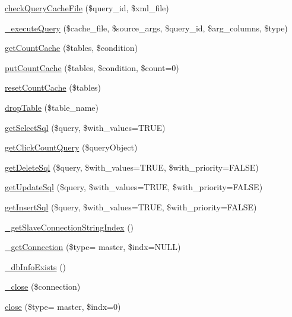 \begin{DoxyCompactItemize}
\hyperlink{classDB_a0bbeb84cee13c54916b7f9aac6db4791}{check\+Query\+Cache\+File} (\$query\+\_\+id, \$xml\+\_\+file)
\item 
\hyperlink{classDB_abb9920613c642481dc4c7b5f6f8fe9b2}{\+\_\+execute\+Query} (\$cache\+\_\+file, \$source\+\_\+args, \$query\+\_\+id, \$arg\+\_\+columns, \$type)
\item 
\hyperlink{classDB_af638cf3ae9ad406810b2f8c2d322225c}{get\+Count\+Cache} (\$tables, \$condition)
\item 
\hyperlink{classDB_a90771d4eaa0ff60a1ddbeb338f2ab801}{put\+Count\+Cache} (\$tables, \$condition, \$count=0)
\item 
\hyperlink{classDB_a8167fd227a1955f8300c0d0e70dd9d9e}{reset\+Count\+Cache} (\$tables)
\item 
\hyperlink{classDB_a63a3a5bdc8e30e1cee37cefddd5ce8de}{drop\+Table} (\$table\+\_\+name)
\item 
\hyperlink{classDB_a5324aefa22399846c6a7fb8afeb6e55d}{get\+Select\+Sql} (\$query, \$with\+\_\+values=T\+R\+U\+E)
\item 
\hyperlink{classDB_a75a6b61801ef6ed2bbf092f1333a8ccd}{get\+Click\+Count\+Query} (\$query\+Object)
\item 
\hyperlink{classDB_aeb58bf0e323895cdc7eda34f09254ed6}{get\+Delete\+Sql} (\$query, \$with\+\_\+values=T\+R\+U\+E, \$with\+\_\+priority=F\+A\+L\+S\+E)
\item 
\hyperlink{classDB_ac467d003673def17f4d397e3f25bcf84}{get\+Update\+Sql} (\$query, \$with\+\_\+values=T\+R\+U\+E, \$with\+\_\+priority=F\+A\+L\+S\+E)
\item 
\hyperlink{classDB_a2664c0b5ba2bc70d02504ebf343e913e}{get\+Insert\+Sql} (\$query, \$with\+\_\+values=T\+R\+U\+E, \$with\+\_\+priority=F\+A\+L\+S\+E)
\item 
\hyperlink{classDB_a8dc4e826557c3de0d49adf7e6112bfea}{\+\_\+get\+Slave\+Connection\+String\+Index} ()
\item 
\hyperlink{classDB_a52b496d073cecfd2ca6e14897b559819}{\+\_\+get\+Connection} (\$type= \textquotesingle{}master\textquotesingle{}, \$indx=N\+U\+L\+L)
\item 
\hyperlink{classDB_a3bbfb0e7579e8d6fc27a20c1219bb693}{\+\_\+db\+Info\+Exists} ()
\item 
\hyperlink{classDB_a8c161612a558f47fb008dec4b46ee05c}{\+\_\+close} (\$connection)
\item 
\hyperlink{classDB_a99ab404981e46ae5b48e11ce46290500}{close} (\$type= \textquotesingle{}master\textquotesingle{}, \$indx=0)
\item 

\end{DoxyCompactItemize}
